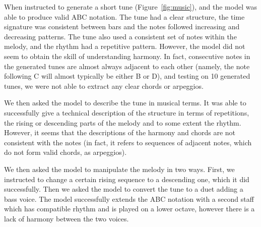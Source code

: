 When instructed to generate a short tune (Figure~\ref{fig:music}), and the model was able to produce valid ABC notation. The tune had a clear structure, the time signature was consistent between bars and the notes followed increasing and decreasing patterns. The tune also used a consistent set of notes within the melody, and the rhythm had a repetitive pattern. However, the model did not seem to obtain the skill of understanding harmony. In fact, consecutive notes in the generated tunes are almost always adjacent to each other (namely, the note following C will almost typically be either B or D), and testing on 10 generated tunes, we were not able to extract any clear chords or arpeggios.

We then asked the model to describe the tune in musical terms. It was able to successfully give a technical description of the structure in terms of repetitions, the rising or descending parts of the melody and to some extent the rhythm. However, it seems that the descriptions of the harmony and chords are not consistent with the notes (in fact, it refers to sequences of adjacent notes, which do not form valid chords, as arpeggios).

We then asked the model to manipulate the melody in two ways. First, we instructed to change a certain rising sequence to a descending one, which it did successfully. Then we asked the model to convert the tune to a duet adding a bass voice. The model successfully extends the ABC notation with a second staff which has compatible rhythm and is played on a lower octave, however there is a lack of harmony between the two voices.

